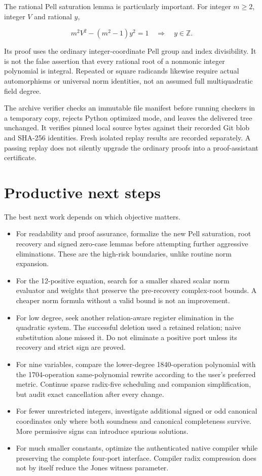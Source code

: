 \documentclass[
  10pt,
]{article}
\providecommand{\tightlist}{%
  \setlength{\itemsep}{0pt}\setlength{\parskip}{0pt}}
\let\oldsection\section
\renewcommand{\section}{\clearpage\oldsection}
\begin{document}
The rational Pell saturation lemma is particularly important. For
integer \(m\ge2\), integer \(V\) and rational \(y\),

\[m^2V^2-(m^2-1)y^2=1\quad\Longrightarrow\quad y\in\mathbb Z.\]

Its proof uses the ordinary integer-coordinate Pell group and index
divisibility. It is not the false assertion that every rational root of
a nonmonic integer polynomial is integral. Repeated or square radicands
likewise require actual automorphisms or universal norm identities, not
an assumed full multiquadratic field degree.

The archive verifier checks an immutable file manifest before running
checkers in a temporary copy, rejects Python optimized mode, and leaves
the delivered tree unchanged. It verifies pinned local source bytes
against their recorded Git blob and SHA-256 identities. Fresh isolated
replay results are recorded separately. A passing replay does not
silently upgrade the ordinary proofs into a proof-assistant certificate.

\section{Productive next steps}\label{productive-next-steps}

The best next work depends on which objective matters.

\begin{itemize}
\tightlist
\item
  For readability and proof assurance, formalize the new Pell
  saturation, root recovery and signed zero-case lemmas before
  attempting further aggressive eliminations. These are the high-risk
  boundaries, unlike routine norm expansion.
\item
  For the 12-positive equation, search for a smaller shared scalar norm
  evaluator and weights that preserve the pre-recovery complex-root
  bounds. A cheaper norm formula without a valid bound is not an
  improvement.
\item
  For low degree, seek another relation-aware register elimination in
  the quadratic system. The successful deletion used a retained
  relation; naive substitution alone missed it. Do not eliminate a
  positive port unless its recovery and strict sign are proved.
\item
  For nine variables, compare the lower-degree 1840-operation polynomial
  with the 1704-operation same-polynomial rewrite according to the
  user's preferred metric. Continue sparse radix-five scheduling and
  companion simplification, but audit exact cancellation after every
  change.
\item
  For fewer unrestricted integers, investigate additional signed or odd
  canonical coordinates only where both soundness and canonical
  completeness survive. More permissive signs can introduce spurious
  solutions.
\item
  For much smaller constants, optimize the authenticated native compiler
  while preserving the complete four-port interface. Compiler radix
  compression does not by itself reduce the Jones witness parameter.
\end{itemize}
\end{document}
